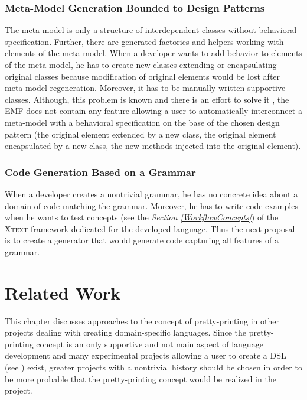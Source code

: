 \documentclass[12pt,notitlepage,a4paper]{report}
\begin{document}
\subsection{Meta-Model Generation Bounded to Design Patterns}

The meta-model is only a structure of interdependent classes without behavioral specification. Further, there are generated  factories and helpers working with elements of the meta-model.
When a developer wants to add behavior to elements of the meta-model, he has to create new classes extending or encapsulating original classes because modification of original elements would be lost after meta-model regeneration. Moreover, it has to be manually written supportive classes. Although, this problem is known and there is an effort to solve it \cite{GenerationGap}, the \textsc{EMF}  does not contain any feature allowing a user to automatically interconnect a meta-model with a behavioral specification on the base of the chosen design pattern (the original element extended by a new class, the original element encapsulated by a new class, the new methods injected into the original element).

\subsection{Code Generation Based on a Grammar}

When a developer creates a nontrivial grammar, he has no concrete idea about a domain of code matching the grammar. Moreover, he has to write code examples when he wants to test concepts (see the \textit{Section \ref{WorkflowConcepts}}) of the \textsc{Xtext} framework dedicated for the developed language. Thus the next proposal is to create a generator that would generate code capturing all features of a grammar. 

\chapter{Related Work}

This chapter discusses approaches to the concept of pretty-printing in other projects dealing with creating domain-specific languages. Since the pretty-printing concept is an only supportive and not main aspect of  language development and many experimental projects allowing a user to create a DSL (see \cite{WorkbenchProjects}) exist, greater projects with a nontrivial history should be chosen in order to be more probable that the pretty-printing concept would be realized in the project.
\end{document}
